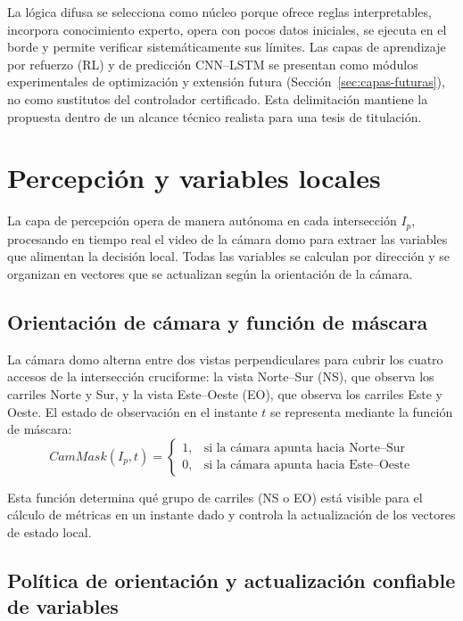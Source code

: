 La lógica difusa se selecciona como núcleo porque ofrece reglas interpretables, incorpora
conocimiento experto, opera con pocos datos iniciales, se ejecuta en el borde y permite
verificar sistemáticamente sus límites. Las capas de aprendizaje por refuerzo (RL) y de
predicción CNN--LSTM se presentan como módulos experimentales de optimización y extensión
futura (Sección~\ref{sec:capas-futuras}), no como sustitutos del controlador certificado.
Esta delimitación mantiene la propuesta dentro de un alcance técnico realista para una tesis
de titulación.

\section{Percepción y variables locales}\label{sec:percepcion}

La capa de percepción opera de manera autónoma en cada intersección $I_{p}$, procesando en
tiempo real el video de la cámara domo para extraer las variables que alimentan la decisión
local. Todas las variables se calculan por dirección y se organizan en vectores que se
actualizan según la orientación de la cámara.

\subsection{Orientación de cámara y función de máscara}\label{subsec:cammask}

La cámara domo alterna entre dos vistas perpendiculares para cubrir los cuatro accesos de la
intersección cruciforme: la vista Norte--Sur (NS), que observa los carriles Norte y Sur, y la
vista Este--Oeste (EO), que observa los carriles Este y Oeste. El estado de observación en el
instante $t$ se representa mediante la función de máscara:
\[
CamMask(I_{p},t) =
\begin{cases}
1, & \text{si la cámara apunta hacia Norte--Sur}\\[2pt]
0, & \text{si la cámara apunta hacia Este--Oeste}
\end{cases}
\]

Esta función determina qué grupo de carriles (NS o EO) está visible para el cálculo de
métricas en un instante dado y controla la actualización de los vectores de estado local.

\subsection{Política de orientación y actualización confiable de variables}\label{subsec:politica-orientacion}

